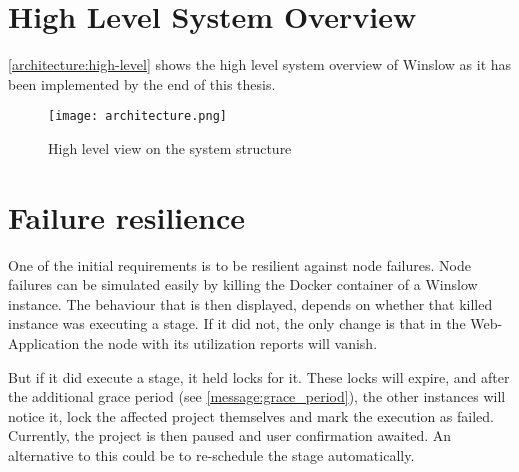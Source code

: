 \section{High Level System Overview}


\autoref{architecture:high-level} shows the high level system overview of Winslow as it has been implemented by the end of this thesis.

\begin{figure}[h]
	\centering
	\texttt{[image: architecture.png]}
	\caption{High level view on the system structure}
	\label{architecture:high-level}
\end{figure}



\section{Failure resilience}


One of the initial requirements is to be resilient against node failures.
Node failures can be simulated easily by killing the Docker container of a Winslow instance.
The behaviour that is then displayed, depends on whether that killed instance was executing a stage.
If it did not, the only change is that in the Web-Application the node with its utilization reports will vanish.

But if it did execute a stage, it held locks for it.
These locks will expire, and after the additional grace period (see \autoref{message:grace_period}), the other instances will notice it, lock the affected project themselves and mark the execution as failed.
Currently, the project is then paused and user confirmation awaited.
An alternative to this could be to re-schedule the stage automatically.